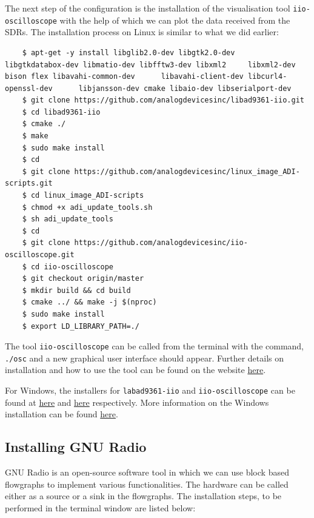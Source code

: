 \documentclass[11pt]{article}
\begin{document}
The next step of the configuration is the installation of the visualisation tool \texttt{iio-oscilloscope} with the help of which we can plot the data received from the SDRs. The installation process on Linux is similar to what we did earlier:

\begin{mdframed}[backgroundcolor=gray!20]
  \tiny
  \begin{verbatim}
    $ apt-get -y install libglib2.0-dev libgtk2.0-dev      libgtkdatabox-dev libmatio-dev libfftw3-dev libxml2     libxml2-dev bison flex libavahi-common-dev      libavahi-client-dev libcurl4-openssl-dev      libjansson-dev cmake libaio-dev libserialport-dev
    $ git clone https://github.com/analogdevicesinc/libad9361-iio.git
    $ cd libad9361-iio
    $ cmake ./
    $ make
    $ sudo make install
    $ cd 
    $ git clone https://github.com/analogdevicesinc/linux_image_ADI-scripts.git
    $ cd linux_image_ADI-scripts
    $ chmod +x adi_update_tools.sh
    $ sh adi_update_tools
    $ cd 
    $ git clone https://github.com/analogdevicesinc/iio-oscilloscope.git
    $ cd iio-oscilloscope
    $ git checkout origin/master
    $ mkdir build && cd build
    $ cmake ../ && make -j $(nproc)
    $ sudo make install
    $ export LD_LIBRARY_PATH=./
  \end{verbatim}
\end{mdframed}

The tool \texttt{iio-oscilloscope} can be called from the terminal with the command, \texttt{./osc} and a new graphical user interface should appear. Further details on installation and how to use the tool can be found on the website \href{https://wiki.analog.com/resources/tools-software/linux-software/iio_oscilloscope}{here}.

\begin{tcolorbox}[colback=blue!5]
  For Windows, the installers for \texttt{labad9361-iio} and \texttt{iio-oscilloscope} can be found at \href{https://github.com/analogdevicesinc/libad9361-iio/releases}{here} and \href{https://github.com/analogdevicesinc/iio-oscilloscope/releases}{here} respectively. More information on the Windows installation can be found \href{https://wiki.analog.com/sdrseminars}{here}.
\end{tcolorbox}



\subsection{Installing GNU Radio}
GNU Radio is an open-source software tool in which we can use block based flowgraphs to implement various functionalities. The hardware can be called either as a source or a sink in the flowgraphs. The installation steps, to be performed in the terminal window are listed below:
\end{document}
